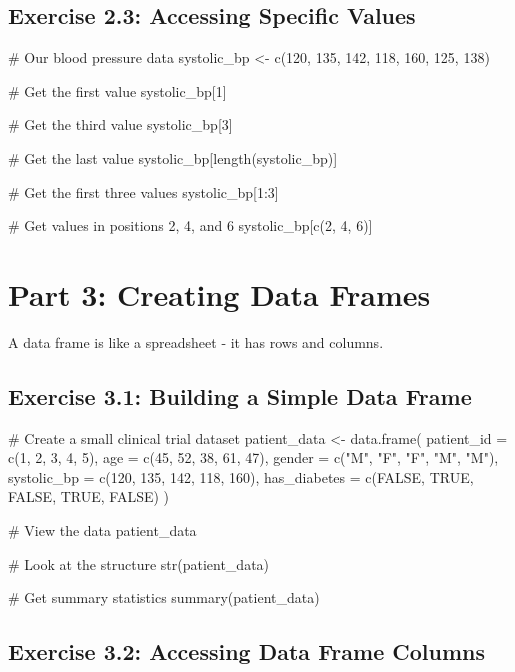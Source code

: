 \documentclass[11pt]{article}
\begin{document}
\subsection{Exercise 2.3: Accessing Specific Values}

\begin{rcode}
# Our blood pressure data
systolic_bp <- c(120, 135, 142, 118, 160, 125, 138)

# Get the first value
systolic_bp[1]

# Get the third value
systolic_bp[3]

# Get the last value
systolic_bp[length(systolic_bp)]

# Get the first three values
systolic_bp[1:3]

# Get values in positions 2, 4, and 6
systolic_bp[c(2, 4, 6)]
\end{rcode}

\section{Part 3: Creating Data Frames}

A data frame is like a spreadsheet - it has rows and columns.

\subsection{Exercise 3.1: Building a Simple Data Frame}

\begin{rcode}
# Create a small clinical trial dataset
patient_data <- data.frame(
  patient_id = c(1, 2, 3, 4, 5),
  age = c(45, 52, 38, 61, 47),
  gender = c("M", "F", "F", "M", "M"),
  systolic_bp = c(120, 135, 142, 118, 160),
  has_diabetes = c(FALSE, TRUE, FALSE, TRUE, FALSE)
)

# View the data
patient_data

# Look at the structure
str(patient_data)

# Get summary statistics
summary(patient_data)
\end{rcode}

\subsection{Exercise 3.2: Accessing Data Frame Columns}

\end{document}
